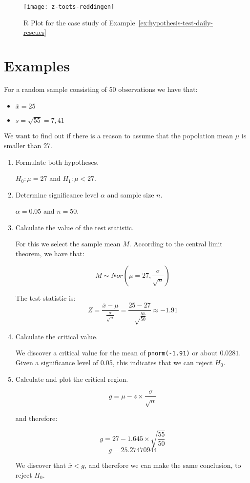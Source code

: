 

\begin{figure}
  \centering
  \texttt{[image: z-toets-reddingen]}
  \caption{R Plot for the case study of Example~\ref{ex:hypothesis-test-daily-rescues}}
\end{figure}

\section{Examples}
\label{sec:testing-procedures-examples}

\begin{example}
  For a random sample consisting of 50 observations we have that:
  \begin{itemize}
    \item $\overline{x} = 25$
    \item $s = \sqrt{55} = 7,41$
  \end{itemize}
  
  We want to find out if there is a reason to assume that the popolation mean $\mu$ is smaller than 27.
  
  \begin{enumerate}
    \item Formulate both hypotheses. 
    
    $H_{0} : \mu = 27$ and $H_{1}: \mu < 27$.
    
    \item Determine significance level $\alpha$ and sample size $n$.
    
    $\alpha = 0.05$ and $n=50$.
    
    \item Calculate the value of the test statistic.
    
    For this we select the sample mean $M$. According to the central limit theorem, we have that:
    
    \[ M \sim Nor(\mu = 27, \frac{\sigma}{\sqrt{n}}) \]
    
    The test statistic is:
    \[ Z = \frac{\overline{x} - \mu}{\frac{\sigma}{\sqrt{n}}} = \frac{25-27}{\sqrt\frac{55}{50}} \approx -1.91\]
    
    \item Calculate the critical value.
    
    We discover a critical value for the mean of \texttt{pnorm(-1.91)} or about $0.0281$. Given a significance level of 0.05, this indicates that we can reject $H_{0}$.
    
    \item Calculate and plot the critical region.
    
    \[ g = \mu - z \times \frac{\sigma}{\sqrt{n}} \]
    
    and therefore:
    
    \[ g = 27 - 1.645 \times \sqrt{\frac{55}{50}} \]
    \[ g =  25.27470944 \]
    
    We discover that $\overline{x} < g$, and therefore we can make the same conclusion, to reject $H_{0}$.
    
  \end{enumerate}
\end{example}

